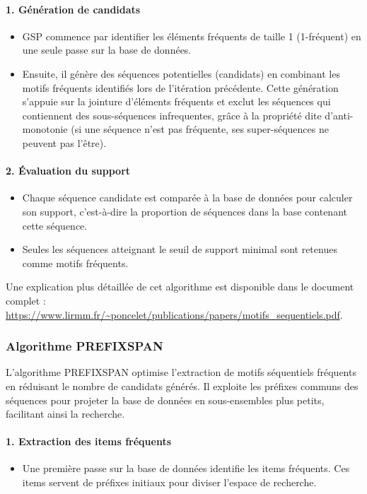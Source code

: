 \documentclass[a4paper,12pt]{article}
\begin{document}
\paragraph{1. Génération de candidats}
\begin{itemize}
    \item GSP commence par identifier les éléments fréquents de taille 1 (1-fréquent) en une seule passe sur la base de données.
    \item Ensuite, il génère des séquences potentielles (candidats) en combinant les motifs fréquents identifiés lors de l’itération précédente. Cette génération s’appuie sur la jointure d’éléments fréquents et exclut les séquences qui contiennent des sous-séquences infrequentes, grâce à la propriété dite d’anti-monotonie (si une séquence n’est pas fréquente, ses super-séquences ne peuvent pas l’être).
\end{itemize}

\paragraph{2. Évaluation du support}
\begin{itemize}
    \item Chaque séquence candidate est comparée à la base de données pour calculer son support, c'est-à-dire la proportion de séquences dans la base contenant cette séquence.
    \item Seules les séquences atteignant le seuil de support minimal sont retenues comme motifs fréquents.
\end{itemize}
\vspace{0.1cm}

Une explication plus détaillée de cet algorithme est disponible dans le document complet : \url{https://www.lirmm.fr/~poncelet/publications/papers/motifs_sequentiels.pdf}.

\subsubsection{Algorithme PREFIXSPAN}
\label{sec:PrefixSpan}
L'algorithme PREFIXSPAN optimise l'extraction de motifs séquentiels fréquents en réduisant le nombre de candidats générés. Il exploite les préfixes communs des séquences pour projeter la base de données en sous-ensembles plus petits, facilitant ainsi la recherche.

\paragraph{1. Extraction des items fréquents}
\begin{itemize}
    \item Une première passe sur la base de données identifie les items fréquents. Ces items servent de préfixes initiaux pour diviser l’espace de recherche.
\end{itemize}
\end{document}
